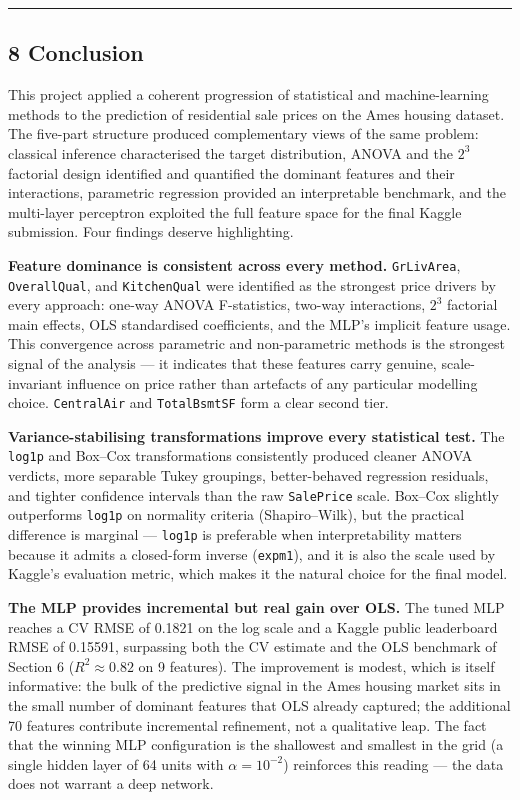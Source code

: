 \begin{center}\rule{0.5\linewidth}{0.5pt}\end{center}

\subsection{8 Conclusion}\label{conclusion}

This project applied a coherent progression of statistical and
machine-learning methods to the prediction of residential sale prices on
the Ames housing dataset. The five-part structure produced complementary
views of the same problem: classical inference characterised the target
distribution, ANOVA and the \(2^3\) factorial design identified and
quantified the dominant features and their interactions, parametric
regression provided an interpretable benchmark, and the multi-layer
perceptron exploited the full feature space for the final Kaggle
submission. Four findings deserve highlighting.

\textbf{Feature dominance is consistent across every method.}
\texttt{GrLivArea}, \texttt{OverallQual}, and \texttt{KitchenQual} were
identified as the strongest price drivers by every approach: one-way
ANOVA F-statistics, two-way interactions, \(2^3\) factorial main
effects, OLS standardised coefficients, and the MLP's implicit feature
usage. This convergence across parametric and non-parametric methods is
the strongest signal of the analysis --- it indicates that these
features carry genuine, scale-invariant influence on price rather than
artefacts of any particular modelling choice. \texttt{CentralAir} and
\texttt{TotalBsmtSF} form a clear second tier.

\textbf{Variance-stabilising transformations improve every statistical
test.} The \texttt{log1p} and Box--Cox transformations consistently
produced cleaner ANOVA verdicts, more separable Tukey groupings,
better-behaved regression residuals, and tighter confidence intervals
than the raw \texttt{SalePrice} scale. Box--Cox slightly outperforms
\texttt{log1p} on normality criteria (Shapiro--Wilk), but the practical
difference is marginal --- \texttt{log1p} is preferable when
interpretability matters because it admits a closed-form inverse
(\texttt{expm1}), and it is also the scale used by Kaggle's evaluation
metric, which makes it the natural choice for the final model.

\textbf{The MLP provides incremental but real gain over OLS.} The tuned
MLP reaches a CV RMSE of 0.1821 on the log scale and a Kaggle public
leaderboard RMSE of 0.15591, surpassing both the CV estimate and the OLS
benchmark of Section 6 (\(R^2 \approx 0.82\) on 9 features). The
improvement is modest, which is itself informative: the bulk of the
predictive signal in the Ames housing market sits in the small number of
dominant features that OLS already captured; the additional 70 features
contribute incremental refinement, not a qualitative leap. The fact that
the winning MLP configuration is the shallowest and smallest in the grid
(a single hidden layer of 64 units with \(\alpha = 10^{-2}\)) reinforces
this reading --- the data does not warrant a deep network.

